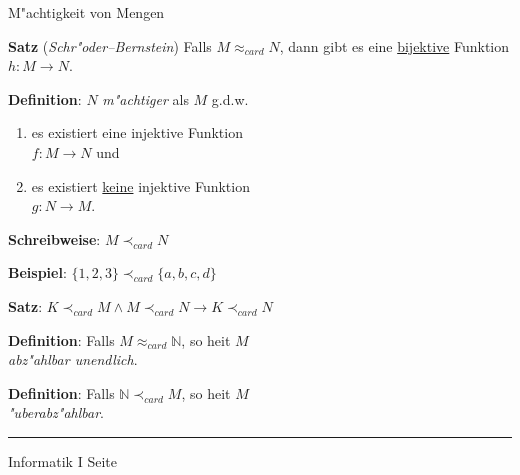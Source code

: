 \begin{slide}{}
\normalsize
\begin{center}
M"achtigkeit von Mengen
\end{center}
\vspace{0.5cm}

\footnotesize
\textbf{Satz} (\textsl{Schr"oder--Bernstein})  Falls $M \approx_{card} N$, dann gibt es
eine \underline{bijektive} Funktion \\[0.3cm]
\hspace*{1.3cm} $h: M \rightarrow N$.
\vspace{0.5cm}


\textbf{Definition}: $N$ \emph{m"achtiger} als $M$ g.d.w.
\begin{enumerate}
\item es existiert eine injektive Funktion \\[0.3cm]
      \hspace*{1.3cm} $f: M \rightarrow N$ \quad und
\item es existiert \underline{keine} injektive Funktion \\[0.3cm]
      \hspace*{1.3cm} $g: N \rightarrow M$.
\end{enumerate}
\textbf{Schreibweise}: $M \prec_{card} N$

\textbf{Beispiel}: $\{1,2,3\} \prec_{card} \{a,b,c,d\}$
\vspace{0.5cm}

\textbf{Satz}:  $K \prec_{card} M \wedge M \prec_{card} N \rightarrow K \prec_{card} N$
\vspace*{0.5cm}


\textbf{Definition}: Falls $M \approx_{card} \mathbb{N}$, so hei\3t $M$ \\
\emph{abz"ahlbar unendlich}.

\textbf{Definition}: Falls $\mathbb{N} \prec_{card} M$, so hei\3t $M$ \\ 
\emph{"uberabz"ahlbar}.

\vspace*{\fill}
\tiny \addtocounter{mypage}{1}
\rule{15cm}{1mm}
Informatik I  \hspace*{\fill} Seite 
\end{slide}




